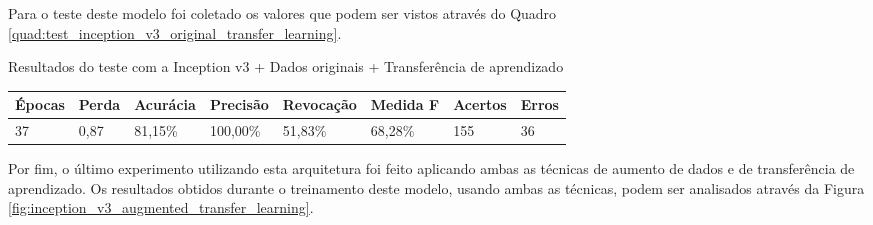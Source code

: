 \documentclass[
	12pt,				%
	oneside,			%
	a4paper,			%
	english,			%
	brazil				%
	]{abntex2ppgsi}
\begin{document}
Para o teste deste modelo foi coletado os valores que podem ser vistos através do Quadro \ref{quad:test_inception_v3_original_transfer_learning}.

\begin{quadro}[H]
\caption{Resultados do teste com a Inception v3 + Dados originais + Transferência de aprendizado}
\label{quad:test_inception_v3_original_transfer_learning}
\centering
\begin{tabular}{|l|l|l|l|l|l|l|l|}
\cline{1-8}
Épocas & Perda & Acurácia & Precisão & Revocação & Medida F & Acertos & Erros \\ \hline
37 & 0,87 & 81,15\% & 100,00\% & 51,83\% & 68,28\% & 155 & 36 \\
\cline{1-8}
\end{tabular}
\end{quadro}

Por fim, o último experimento utilizando esta arquitetura foi feito aplicando ambas as técnicas de aumento de dados e de transferência de aprendizado. Os resultados obtidos durante o treinamento deste modelo, usando ambas as técnicas, podem ser analisados através da Figura \ref{fig:inception_v3_augmented_transfer_learning}.
\end{document}
